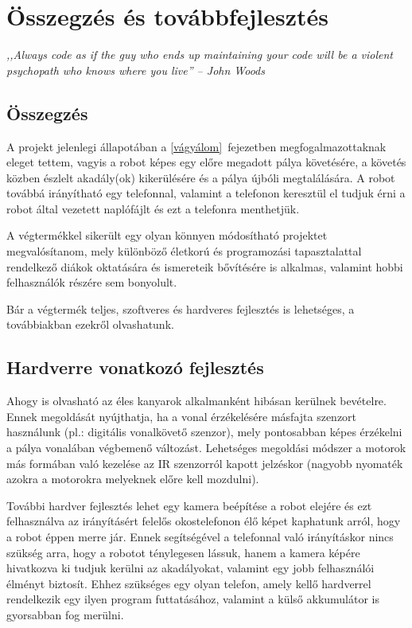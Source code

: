 \documentclass[]{thesis-ekf}
\theoremstyle{definition}
\begin{document}
\chapter{Összegzés és továbbfejlesztés}\label{fejezet_8}
\emph{,,Always code as if the guy who ends up maintaining your code will be a violent psychopath who knows where you live'' -- John Woods}
\section{Összegzés}
A projekt jelenlegi állapotában a \ref{vágyálom}~fejezetben megfogalmazottaknak eleget tettem, vagyis a robot képes egy előre megadott pálya követésére, a követés közben észlelt akadály(ok) kikerülésére és a pálya újbóli megtalálására. A robot továbbá irányítható egy telefonnal, valamint a telefonon keresztül el tudjuk érni a robot által vezetett naplófájlt és ezt a telefonra menthetjük.

A végtermékkel sikerült egy olyan könnyen módosítható projektet megvalósítanom, mely különböző életkorú és programozási tapasztalattal rendelkező diákok oktatására és ismereteik bővítésére is alkalmas, valamint hobbi felhasználók részére sem bonyolult.

Bár a végtermék teljes, szoftveres és hardveres fejlesztés is lehetséges, a továbbiakban ezekről olvashatunk.
\section{Hardverre vonatkozó fejlesztés}
Ahogy  is olvasható az éles kanyarok alkalmanként hibásan kerülnek bevételre. Ennek megoldását nyújthatja, ha a vonal érzékelésére másfajta szenzort használunk (pl.: digitális vonalkövető szenzor), mely pontosabban képes érzékelni a pálya vonalában végbemenő változást.
Lehetséges megoldási módszer a motorok más formában való kezelése az IR szenzorról kapott jelzéskor (nagyobb nyomaték azokra a motorokra melyeknek előre kell mozdulni).

További hardver fejlesztés lehet egy kamera beépítése a robot elejére és ezt felhasználva az irányításért felelős okostelefonon élő képet kaphatunk arról, hogy a robot éppen merre jár. Ennek segítségével a telefonnal való irányításkor nincs szükség arra, hogy a robotot ténylegesen lássuk, hanem a kamera képére hivatkozva ki tudjuk kerülni az akadályokat, valamint egy jobb felhasználói élményt biztosít. Ehhez szükséges egy olyan telefon, amely kellő hardverrel rendelkezik egy ilyen program futtatásához, valamint a külső akkumulátor is gyorsabban fog merülni.
\end{document}
